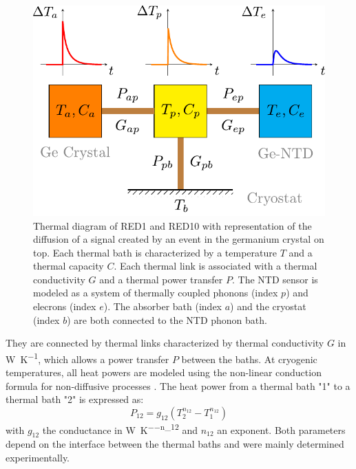 \begin{figure}
\begin{center}
\includegraphics[scale=1]{Figures/Ethem/thermal_scheme.pdf}
\end{center}
\caption{Thermal diagram of RED1 and RED10 with representation of the diffusion of a signal created by an event in the germanium crystal on top. Each thermal bath is characterized by a temperature $T$ and a thermal capacity $C$. Each thermal link is associated with a thermal conductivity $G$ and a thermal power transfer $P$. The NTD sensor is modeled as a system of thermally coupled phonons (index $p$) and elecrons (index $e$). The absorber bath (index $a$) and the cryostat (index $b$) are both connected to the NTD phonon bath.}
\label{fig:thermal-scheme}
\end{figure}

They are connected by thermal links characterized by thermal conductivity $G$ in \si{\watt\per\kelvin}, which allows a power transfer $P$ between the baths.
At cryogenic temperatures, all heat powers are modeled using the non-linear conduction formula for non-diffusive processes \cite{Galeazzi:2003pe}.
The heat power from a thermal bath "1" to a thermal bath "2" is expressed as:
\begin{equation}
\label{eq:kaptiza-conduction}
P_{12} = g_{12} \left( T_2^{n_{12}} - T_1^{n_{12}}\right)
\end{equation}
with $g_{12}$ the conductance in \si{\watt\per\kelvin^{-n_{12}}} and $n_{12}$ an exponent. Both parameters depend on the interface between the thermal baths and were mainly determined experimentally.

